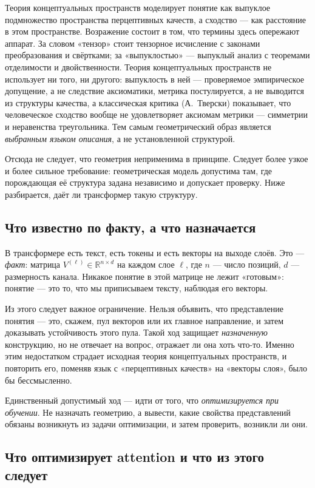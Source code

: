 \documentclass[11pt,a4paper]{article}
\theoremstyle{definition}
\theoremstyle{plain}
\newcommand{\R}{\mathbb{R}}
\begin{document}
Теория концептуальных пространств моделирует понятие как выпуклое подмножество пространства
перцептивных качеств, а сходство — как расстояние в этом пространстве. Возражение состоит в
том, что термины здесь опережают аппарат. За словом «тензор» стоит тензорное исчисление с
законами преобразования и свёртками; за «выпуклостью» — выпуклый анализ с теоремами
отделимости и двойственности. Теория концептуальных пространств не использует ни того, ни
другого: выпуклость в ней — проверяемое эмпирическое допущение, а не следствие аксиоматики,
метрика постулируется, а не выводится из структуры качества, а классическая критика
(А.~Тверски) показывает, что человеческое сходство вообще не удовлетворяет аксиомам метрики —
симметрии и неравенства треугольника. Тем самым геометрический образ является
\emph{выбранным языком описания}, а не установленной структурой.

Отсюда не следует, что геометрия неприменима в принципе. Следует более узкое и более
сильное требование: геометрическая модель допустима там, где порождающая её структура
задана независимо и допускает проверку. Ниже разбирается, даёт ли трансформер такую структуру.

\subsection{Что известно по факту, а что назначается}

В трансформере есть текст, есть токены и есть векторы на выходе слоёв. Это — \emph{факт}:
матрица $V^{(\ell)}\in\R^{n\times d}$ на каждом слое $\ell$, где $n$ — число позиций, $d$ —
размерность канала. Никакое понятие в этой матрице не лежит «готовым»: понятие — это то, что
мы приписываем тексту, наблюдая его векторы.

Из этого следует важное ограничение. Нельзя объявить, что представление понятия — это, скажем,
пул векторов или их главное направление, и затем доказывать устойчивость этого пула. Такой
ход защищает \emph{назначенную} конструкцию, но не отвечает на вопрос, отражает ли она хоть
что-то. Именно этим недостатком страдает исходная теория концептуальных пространств, и
повторить его, поменяв язык с «перцептивных качеств» на «векторы слоя», было бы бессмысленно.

Единственный допустимый ход — идти от того, что \emph{оптимизируется при обучении}. Не
назначать геометрию, а вывести, какие свойства представлений обязаны возникнуть из задачи
оптимизации, и затем проверить, возникли ли они.

\subsection{Что оптимизирует attention и что из этого следует}
\end{document}

